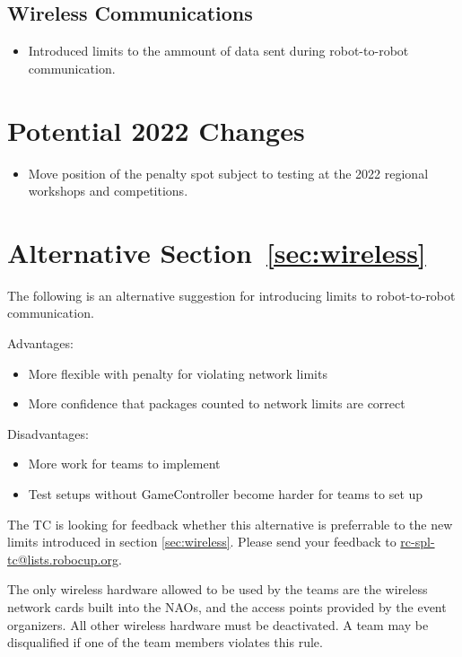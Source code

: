 \subsection*{Wireless Communications}
\begin{itemize}
  \item Introduced limits to the ammount of data sent during robot-to-robot communication.
\end{itemize}

\section{Potential 2022 Changes}
\begin{itemize}
  \item Move position of the penalty spot subject to testing at the 2022 regional workshops and competitions.
\end{itemize}

\section{Alternative Section~\ref{sec:wireless}}
The following is an alternative suggestion for introducing limits to robot-to-robot communication.

Advantages:
\begin{itemize}
  \item More flexible with penalty for violating network limits
  \item More confidence that packages counted to network limits are correct
\end{itemize}

Disadvantages:
\begin{itemize}
  \item More work for teams to implement
  \item Test setups without GameController become harder for teams to set up
\end{itemize}

The TC is looking for feedback whether this alternative is preferrable to the new limits introduced in section \ref{sec:wireless}. Please send your feedback to \url{rc-spl-tc@lists.robocup.org}.

The only wireless hardware allowed to be used by the teams are the wireless network cards built into the NAOs, and the access points provided by the event organizers. All other wireless hardware must be deactivated. A team may be disqualified if one of the team members violates this rule.

